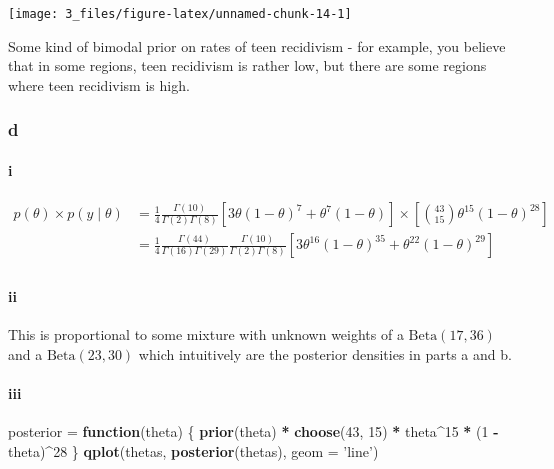 \documentclass[]{article}
\newenvironment{Shaded}{\begin{snugshade}}{\end{snugshade}}
\newcommand{\ControlFlowTok}[1]{\textcolor[rgb]{0.13,0.29,0.53}{\textbf{#1}}}
\newcommand{\DataTypeTok}[1]{\textcolor[rgb]{0.13,0.29,0.53}{#1}}
\newcommand{\DecValTok}[1]{\textcolor[rgb]{0.00,0.00,0.81}{#1}}
\newcommand{\KeywordTok}[1]{\textcolor[rgb]{0.13,0.29,0.53}{\textbf{#1}}}
\newcommand{\NormalTok}[1]{#1}
\newcommand{\OperatorTok}[1]{\textcolor[rgb]{0.81,0.36,0.00}{\textbf{#1}}}
\newcommand{\StringTok}[1]{\textcolor[rgb]{0.31,0.60,0.02}{#1}}
\let\oldparagraph\paragraph
\renewcommand{\paragraph}[1]{\oldparagraph{#1}\mbox{}}
\begin{document}
\begin{center}\texttt{[image: 3\_files/figure-latex/unnamed-chunk-14-1]} \end{center}

Some kind of bimodal prior on rates of teen recidivism - for example,
you believe that in some regions, teen recidivism is rather low, but
there are some regions where teen recidivism is high.

\hypertarget{d-1}{%
\subsubsection{d}\label{d-1}}

\hypertarget{i}{%
\paragraph{i}\label{i}}

\begin{align}
p(\theta) \times p(y \mid \theta) &= \frac{1}{4}\frac{\Gamma(10)}{\Gamma(2) \Gamma(8)} \left[ 3\theta (1 - \theta)^7 + \theta^7 (1 - \theta) \right] \times \left[ {43 \choose 15} \theta^{15} (1 - \theta)^{28} \right] \\
&= \frac{1}{4} \frac{\Gamma(44)}{\Gamma(16) \Gamma(29)} \frac{\Gamma(10)}{\Gamma(2) \Gamma(8)} \left[3\theta^{16} (1 - \theta)^{35} + \theta^{22} (1 - \theta)^{29} \right] \\
\end{align}

\hypertarget{ii}{%
\paragraph{ii}\label{ii}}

This is proportional to some mixture with unknown weights of a
\(\text{Beta}(17, 36)\) and a \(\text{Beta}(23, 30)\) which intuitively
are the posterior densities in parts a and b.

\hypertarget{iii}{%
\paragraph{iii}\label{iii}}

\begin{Shaded}
\begin{Highlighting}[]
\NormalTok{posterior =}\StringTok{ }\ControlFlowTok{function}\NormalTok{(theta) \{}
  \KeywordTok{prior}\NormalTok{(theta) }\OperatorTok{*}\StringTok{ }\KeywordTok{choose}\NormalTok{(}\DecValTok{43}\NormalTok{, }\DecValTok{15}\NormalTok{) }\OperatorTok{*}\StringTok{ }\NormalTok{theta}\OperatorTok{^}\DecValTok{15} \OperatorTok{*}\StringTok{ }\NormalTok{(}\DecValTok{1} \OperatorTok{-}\StringTok{ }\NormalTok{theta)}\OperatorTok{^}\DecValTok{28}
\NormalTok{\}}
\KeywordTok{qplot}\NormalTok{(thetas, }\KeywordTok{posterior}\NormalTok{(thetas), }\DataTypeTok{geom =} \StringTok{'line'}\NormalTok{)}
\end{Highlighting}
\end{Shaded}
\end{document}
